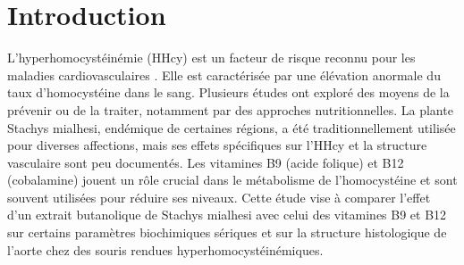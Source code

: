 \section{Introduction}
L'hyperhomocystéinémie (HHcy) est un facteur de risque reconnu pour les maladies cardiovasculaires \cite{placeholder_hcy}. Elle est caractérisée par une élévation anormale du taux d'homocystéine dans le sang. Plusieurs études ont exploré des moyens de la prévenir ou de la traiter, notamment par des approches nutritionnelles.
La plante Stachys mialhesi, endémique de certaines régions, a été traditionnellement utilisée pour diverses affections, mais ses effets spécifiques sur l'HHcy et la structure vasculaire sont peu documentés.
Les vitamines B9 (acide folique) et B12 (cobalamine) jouent un rôle crucial dans le métabolisme de l'homocystéine et sont souvent utilisées pour réduire ses niveaux.
Cette étude vise à comparer l'effet d'un extrait butanolique de Stachys mialhesi avec celui des vitamines B9 et B12 sur certains paramètres biochimiques sériques et sur la structure histologique de l'aorte chez des souris rendues hyperhomocystéinémiques.
